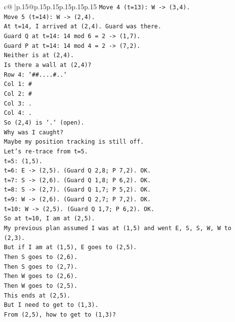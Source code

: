 \documentclass{article}
\begin{document}
{\begin{supertabular}{c@{$\;$}|p{.15\linewidth}@{}p{.15\linewidth}p{.15\linewidth}p{.15\linewidth}p{.15\linewidth}p{.15\linewidth}}
{{{\texttt{Move 4 (t=13): W {-}> (3,4).} \\
\texttt{Move 5 (t=14): W {-}> (2,4).} \\
\texttt{At t=14, I arrived at (2,4). Guard was there.} \\
\texttt{Guard Q at t=14: 14 mod 6 = 2 {-}> (1,7).} \\
\texttt{Guard P at t=14: 14 mod 4 = 2 {-}> (7,2).} \\
\texttt{Neither is at (2,4).} \\
\texttt{Is there a wall at (2,4)?} \\
\texttt{Row 4: `\#\#....\#..`} \\
\texttt{Col 1: \#} \\
\texttt{Col 2: \#} \\
\texttt{Col 3: .} \\
\texttt{Col 4: .} \\
\texttt{So (2,4) is `.` (open).} \\
\texttt{Why was I caught?} \\
\texttt{Maybe my position tracking is still off.} \\
\texttt{Let's re{-}trace from t=5.} \\
\texttt{t=5: (1,5).} \\
\texttt{t=6: E {-}> (2,5). (Guard Q 2,8; P 7,2). OK.} \\
\texttt{t=7: S {-}> (2,6). (Guard Q 1,8; P 6,2). OK.} \\
\texttt{t=8: S {-}> (2,7). (Guard Q 1,7; P 5,2). OK.} \\
\texttt{t=9: W {-}> (2,6). (Guard Q 2,7; P 7,2). OK.} \\
\texttt{t=10: W {-}> (2,5). (Guard Q 1,7; P 6,2). OK.} \\
\texttt{So at t=10, I am at (2,5).} \\
\texttt{My previous plan assumed I was at (1,5) and went E, S, S, W, W to (2,3).} \\
\texttt{But if I am at (1,5), E goes to (2,5).} \\
\texttt{Then S goes to (2,6).} \\
\texttt{Then S goes to (2,7).} \\
\texttt{Then W goes to (2,6).} \\
\texttt{Then W goes to (2,5).} \\
\texttt{This ends at (2,5).} \\
\texttt{But I need to get to (1,3).} \\
\texttt{From (2,5), how to get to (1,3)?} \\
}}}
\end{supertabular}}
\end{document}
